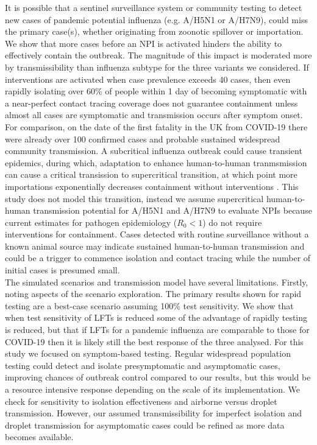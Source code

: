 \documentclass{article}
\begin{document}
It is possible that a sentinel surveillance system or community testing to detect new cases of pandemic potential influenza (e.g. A/H5N1 or A/H7N9), could miss the primary case(s), whether originating from zoonotic spillover or importation. We show that more cases before an NPI is activated hinders the ability to effectively contain the outbreak. The magnitude of this impact is moderated more by transmissibility than influenza subtype for the three variants we considered. If interventions are activated when case prevalence exceeds 40 cases, then even rapidly isolating over 60\% of people within 1 day of becoming symptomatic with a near-perfect contact tracing coverage does not guarantee containment unless almost all cases are symptomatic and transmission occurs after symptom onset. For comparison, on the date of the first fatality in the UK from COVID-19 there were already over 100 confirmed cases and probable sustained widespread community transmission. A subcritical influenza outbreak could cause transient epidemics, during which, adaptation to enhance human-to-human tranmsmission can cause a critical transission to supercritical transition, at which point more importations exponentially decreases containment without interventions \citep{whittleOutcomeStochasticEpidemicA1955, farringtonDistributionTimeExtinction1999, antiaRoleEvolutionEmergence2003, lloyd-smithSuperspreadingEffectIndividual2005}. This study does not model this transition, instead we assume supercritical human-to-human transmission potential for A/H5N1 and A/H7N9 to evaluate NPIs because current estimates for pathogen epidemiology ($R_0 < 1$) do not require interventions for containment. Cases detected with routine surveillance without a known animal source may indicate sustained human-to-human transmission and could be a trigger to commence isolation and contact tracing while the number of initial cases is presumed small. \\


The simulated scenarios and transmission model have several limitations. Firstly, noting aspects of the scenario exploration. The primary results shown for rapid testing are a best-case scenario assuming 100\% test sensitivity. We show that when test sensitivity of LFTs is reduced some of the advantage of rapidly testing is reduced, but that if LFTs for a pandemic influenza are comparable to those for COVID-19 then it is likely still the best response of the three analysed. For this study we focused on symptom-based testing. Regular widespread population testing could detect and isolate presymptomatic and asymptomatic cases, improving chances of outbreak control compared to our results, but this would be a resource intensive response depending on the scale of its implementation. We check for sensitivity to isolation effectiveness and airborne versus droplet transmission. However, our assumed transmissibility for imperfect isolation and droplet transmission for asymptomatic cases could be refined as more data becomes available. \\
\end{document}
